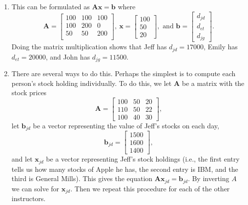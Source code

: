 \begin{sol}
	\begin{enumerate}
		\item This can be formulated as $\mathbf{A}\mathbf{x}=\mathbf{b}$ where $$\mathbf{A}=\begin{bmatrix}100 & 100 & 100 \\
			100 & 200 & 0 \\
			50 & 50 & 200 \\
			\end{bmatrix}, \ \mathbf{x}=\begin{bmatrix}100 \\ 50 \\ 20\end{bmatrix}, \text{ and } \mathbf{b} = \begin{bmatrix} d_{jd} \\ d_{et} \\ d_{jg}\end{bmatrix}.$$
			Doing the matrix multiplication shows that Jeff has $d_{jd}=17000$, Emily has $d_{et}=20000$, and John has $d_{jg}=11500$. 
			
		\item There are several ways to do this. Perhaps the simplest is to compute each person's stock holding individually. To do this, we let $\mathbf{A}$ be a matrix with the stock prices
		$$\mathbf{A} = \begin{bmatrix} 100 & 50 & 20 \\ 110 & 50 & 22 \\ 100 & 40 & 30 \end{bmatrix},$$
		let $\mathbf{b}_{jd}$ be a vector representing the value of Jeff's stocks on each day,
		$$\mathbf{b}_{jd} = \begin{bmatrix} 1500 \\ 1600 \\ 1400 \end{bmatrix},$$
		and let $\mathbf{x}_{jd}$ be a vector representing Jeff's stock holdings (i.e., the first entry tells us how many stocks of Apple he has, the second entry is IBM, and the third is General Mills). This gives the equation $\mathbf{Ax}_{jd} = \mathbf{b}_{jd}$. By inverting $A$ we can solve for $\mathbf{x}_{jd}$. Then we repeat this procedure for each of the other instructors.
		

\end{enumerate}
\end{sol}
